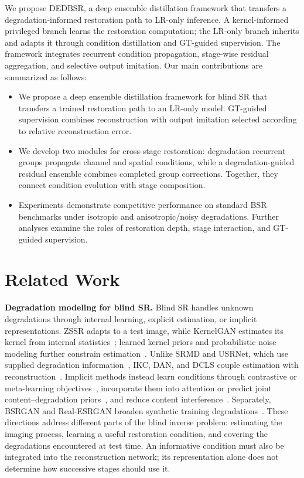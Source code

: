 \documentclass[10pt,journal,letterpaper]{IEEEtran}
\begin{document}
We propose DEDBSR, a deep ensemble distillation framework that transfers a degradation-informed restoration path to LR-only inference. A kernel-informed privileged branch learns the restoration computation; the LR-only branch inherits and adapts it through condition distillation and GT-guided supervision. The framework integrates recurrent condition propagation, stage-wise residual aggregation, and selective output imitation. Our main contributions are summarized as follows:

\begin{itemize}
\item We propose a deep ensemble distillation framework for blind SR that transfers a trained restoration path to an LR-only model. GT-guided supervision combines reconstruction with output imitation selected according to relative reconstruction error.
\item We develop two modules for cross-stage restoration: degradation recurrent groups propagate channel and spatial conditions, while a degradation-guided residual ensemble combines completed group corrections. Together, they connect condition evolution with stage composition.
\item Experiments demonstrate competitive performance on standard BSR benchmarks under isotropic and anisotropic/noisy degradations. Further analyses examine the roles of restoration depth, stage interaction, and GT-guided supervision.
\end{itemize}

\section{Related Work}
\label{sec:related_work}

\noindent\textbf{Degradation modeling for blind SR.}
Blind SR handles unknown degradations through internal learning, explicit estimation, or implicit representations. ZSSR adapts to a test image, while KernelGAN estimates its kernel from internal statistics~\cite{shocher2018zssr,bellkligler2019kernelgan}; learned kernel priors and probabilistic noise modeling further constrain estimation~\cite{liang2021fkp,yue2022bsrdm}. Unlike SRMD and USRNet, which use supplied degradation information~\cite{zhang2018srmd,zhang2020usrnet}, IKC, DAN, and DCLS couple estimation with reconstruction~\cite{gu2019ikc,luo2020dan,luo2022dcls}. Implicit methods instead learn conditions through contrastive or meta-learning objectives~\cite{wang2021dasr,xia2023mrda}, incorporate them into attention or predict joint content--degradation priors~\cite{liu2024dsat,liu2024cdformer}, and reduce content interference~\cite{chen2025drat,yuan2025cdcl}. Separately, BSRGAN and Real-ESRGAN broaden synthetic training degradations~\cite{zhang2021bsrgan,wang2021realesrgan}. These directions address different parts of the blind inverse problem: estimating the imaging process, learning a useful restoration condition, and covering the degradations encountered at test time. An informative condition must also be integrated into the reconstruction network; its representation alone does not determine how successive stages should use it.
\end{document}
